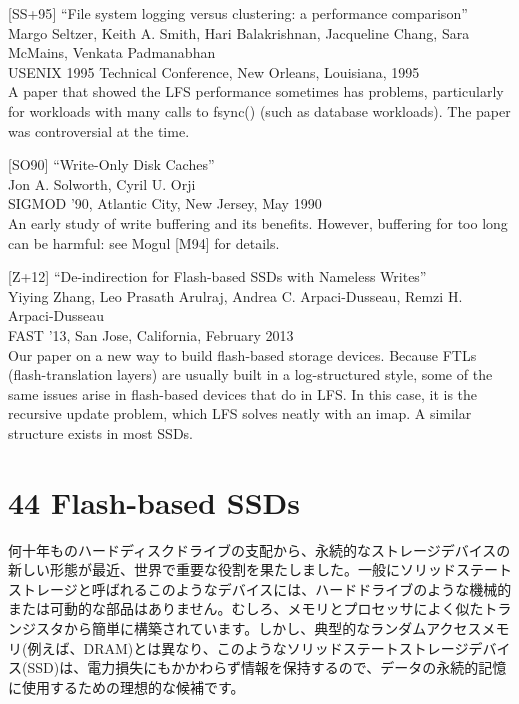 {[}SS+95{]} ``File system logging versus clustering: a performance
comparison''\\
Margo Seltzer, Keith A. Smith, Hari Balakrishnan, Jacqueline Chang, Sara
McMains, Venkata Padmanabhan\\
USENIX 1995 Technical Conference, New Orleans, Louisiana, 1995\\
A paper that showed the LFS performance sometimes has problems,
particularly for workloads with many calls to fsync() (such as database
workloads). The paper was controversial at the time.

{[}SO90{]} ``Write-Only Disk Caches''\\
Jon A. Solworth, Cyril U. Orji\\
SIGMOD '90, Atlantic City, New Jersey, May 1990\\
An early study of write buffering and its benefits. However, buffering
for too long can be harmful: see Mogul {[}M94{]} for details.

{[}Z+12{]} ``De-indirection for Flash-based SSDs with Nameless
Writes''\\
Yiying Zhang, Leo Prasath Arulraj, Andrea C. Arpaci-Dusseau, Remzi H.
Arpaci-Dusseau\\
FAST '13, San Jose, California, February 2013\\
Our paper on a new way to build flash-based storage devices. Because
FTLs (flash-translation layers) are usually built in a log-structured
style, some of the same issues arise in flash-based devices that do in
LFS. In this case, it is the recursive update problem, which LFS solves
neatly with an imap. A similar structure exists in most SSDs.

\newpage

\hypertarget{flash-based-ssds}{%
\section*{44 Flash-based SSDs}\label{flash-based-ssds}}

何十年ものハードディスクドライブの支配から、永続的なストレージデバイスの新しい形態が最近、世界で重要な役割を果たしました。一般にソリッドステートストレージと呼ばれるこのようなデバイスには、ハードドライブのような機械的または可動的な部品はありません。むしろ、メモリとプロセッサによく似たトランジスタから簡単に構築されています。しかし、典型的なランダムアクセスメモリ(例えば、DRAM)とは異なり、このようなソリッドステートストレージデバイス(SSD)は、電力損失にもかかわらず情報を保持するので、データの永続的記憶に使用するための理想的な候補です。


